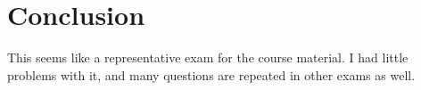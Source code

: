 \section*{Conclusion}\label{sec:conclusion}

This seems like a representative exam for the course material. I had little problems with it, and many questions are repeated in other exams as well.
